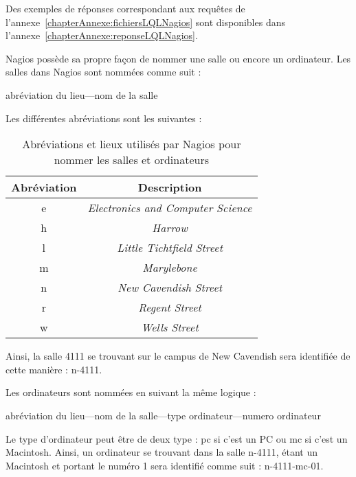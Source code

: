 Des exemples de r\'eponses correspondant aux requ\^etes de l'annexe~\ref{chapterAnnexe:fichiersLQLNagios} sont disponibles dans l'annexe~\ref{chapterAnnexe:reponseLQLNagios}.

Nagios poss\`ede sa propre fa\c{c}on de nommer une salle ou encore un ordinateur.
\noindent Les salles dans Nagios sont nomm\'ees comme suit : 

\begin{center}
	\textsf{abr\'eviation du lieu---nom de la salle}

\end{center}

\noindent Les diff\'erentes abr\'eviations sont les suivantes :

\begin{table}[!ht]
	\centering
	\begin{tabular}{|c|c|}
		\hline
		\rowcolor{grisclair} \textbf{Abr\'eviation} & \textbf{Description}\\
		\hline
		e & \textit{Electronics and Computer Science}\\
		\hline
		h & \textit{Harrow}\\
		\hline
		l & \textit{Little Tichtfield Street}\\
		\hline
		m & \textit{Marylebone}\\
		\hline
		n & \textit{New Cavendish Street}\\
		\hline
		r & \textit{Regent Street}\\
		\hline
		w & \textit{Wells Street}\\
		\hline
	
	\end{tabular}
	
	\caption{Abr\'eviations et lieux utilis\'es par Nagios pour nommer les salles et ordinateurs}
	\label{table:abreviation}

\end{table}

Ainsi, la salle \textsf{4111} se trouvant sur le campus de New Cavendish sera identifi\'ee de cette mani\`ere : \textsf{n-4111}.

\noindent Les ordinateurs sont nomm\'ees en suivant la m\^eme logique :

\begin{center}
	\textsf{abr\'eviation du lieu---nom de la salle---type ordinateur---numero ordinateur}
	
\end{center}

Le type d'ordinateur peut \^etre de deux type : \textsf{pc} si c'est un PC ou \textsf{mc} si c'est un Macintosh.
Ainsi, un ordinateur se trouvant dans la salle \textsf{n-4111}, \'etant un Macintosh et portant le num\'ero 1 sera identifi\'e comme suit : \textsf{n-4111-mc-01}.

